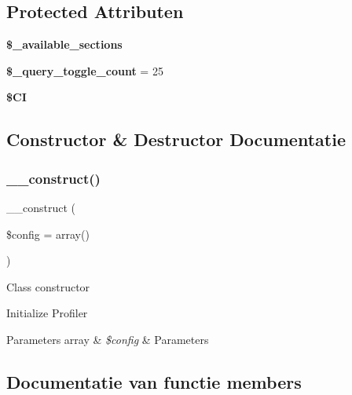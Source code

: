 \subsection*{Protected Attributen}
\begin{DoxyCompactItemize}
\item 
{\bfseries \$\+\_\+available\+\_\+sections}
\item 
\mbox{\label{class_c_i___profiler_a950aa6662ddde22ba9c05adffd6a20c9}} 
{\bfseries \$\+\_\+query\+\_\+toggle\+\_\+count} = 25
\item 
\mbox{\label{class_c_i___profiler_ae0314d046ddf7fcfaec03222977427d3}} 
{\bfseries \$\+CI}
\end{DoxyCompactItemize}


\subsection{Constructor \& Destructor Documentatie}
\mbox{\label{class_c_i___profiler_af7f9493844d2d66e924e3c1df51ce616}} 
\subsubsection{\texorpdfstring{\_\_construct()}{\_\_construct()}}
{\footnotesize\ttfamily \+\_\+\+\_\+construct (\begin{DoxyParamCaption}\item[{}]{\$config = {\ttfamily array()} }\end{DoxyParamCaption})}

Class constructor

Initialize Profiler


\begin{DoxyParams}[1]{Parameters}
array & {\em \$config} & Parameters \\
\hline
\end{DoxyParams}


\subsection{Documentatie van functie members}
\mbox{\label{class_c_i___profiler_acecf392de9d6129d3843c64fca7a4766}} 
